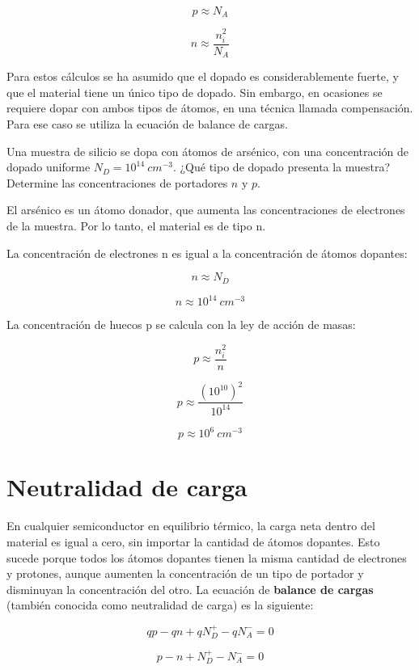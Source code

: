 \[ p \approx N_A \]

\[ n \approx \dfrac{n_i^2}{N_A} \]

Para estos cálculos se ha asumido que el dopado es considerablemente fuerte, y que el material tiene un único tipo de dopado. Sin embargo, en ocasiones se requiere dopar con ambos tipos de átomos, en una técnica llamada compensación. Para ese caso se utiliza la ecuación de balance de cargas. 

\begin{ejemplo}
Una muestra de silicio se dopa con átomos de arsénico, con una concentración de dopado uniforme $N_D=10^{14}\ cm^{-3}$. ¿Qué tipo de dopado presenta la muestra? Determine las concentraciones de portadores $n$ y $p$.
\end{ejemplo}

\begin{solucion}
El arsénico es un átomo donador, que aumenta las concentraciones de electrones de la muestra. Por lo tanto, el material es de tipo n.

La concentración de electrones n es igual a la concentración de átomos dopantes:

\[ n \approx N_D \]

\[ n \approx 10^{14}\ cm^{-3} \]

La concentración de huecos p se calcula con la ley de acción de masas:

\[ p \approx \dfrac{n_i^2}{n} \]

\[ p \approx \dfrac{(10^{10})^2}{10^{14}} \]

\[ p \approx 10^6\ cm^{-3} \]
\end{solucion}


\newpage
\section{Neutralidad de carga}

En cualquier semiconductor en equilibrio térmico, la carga neta dentro del material es igual a cero, sin importar la cantidad de átomos dopantes. Esto sucede porque todos los átomos dopantes tienen la misma cantidad de electrones y protones, aunque aumenten la concentración de un tipo de portador y disminuyan la concentración del otro. La ecuación de \textbf{balance de cargas} (también conocida como neutralidad de carga) es la siguiente:

\[ qp - qn + qN_D^+ - qN_A^- = 0 \]

\[ p - n + N_D^+ - N_A^- = 0 \]

